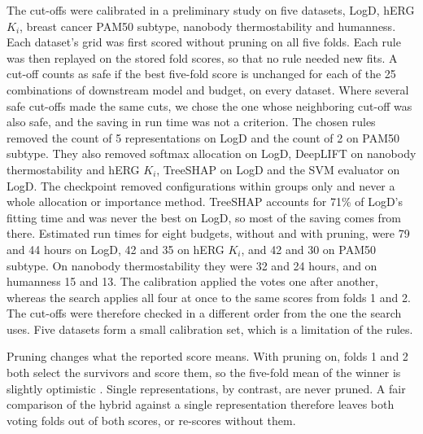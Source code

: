 The cut-offs were calibrated in a preliminary study on five datasets, LogD, hERG $K_i$, breast cancer PAM50 subtype, nanobody thermostability and humanness. Each dataset's grid was first scored without pruning on all five folds. Each rule was then replayed on the stored fold scores, so that no rule needed new fits. A cut-off counts as safe if the best five-fold score is unchanged for each of the 25 combinations of downstream model and budget, on every dataset. Where several safe cut-offs made the same cuts, we chose the one whose neighboring cut-off was also safe, and the saving in run time was not a criterion. The chosen rules removed the count of 5 representations on LogD and the count of 2 on PAM50 subtype. They also removed softmax allocation on LogD, DeepLIFT on nanobody thermostability and hERG $K_i$, TreeSHAP on LogD and the SVM evaluator on LogD. The checkpoint removed configurations within groups only and never a whole allocation or importance method. TreeSHAP accounts for 71\% of LogD's fitting time and was never the best on LogD, so most of the saving comes from there. Estimated run times for eight budgets, without and with pruning, were 79 and 44 hours on LogD, 42 and 35 on hERG $K_i$, and 42 and 30 on PAM50 subtype. On nanobody thermostability they were 32 and 24 hours, and on humanness 15 and 13. The calibration applied the votes one after another, whereas the search applies all four at once to the same scores from folds 1 and 2. The cut-offs were therefore checked in a different order from the one the search uses. Five datasets form a small calibration set, which is a limitation of the rules.

Pruning changes what the reported score means. With pruning on, folds 1 and 2 both select the survivors and score them, so the five-fold mean of the winner is slightly optimistic \citep{Cawley2010}. Single representations, by contrast, are never pruned. A fair comparison of the hybrid against a single representation therefore leaves both voting folds out of both scores, or re-scores without them.

